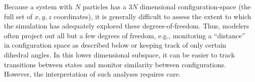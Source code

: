 




Because a system with $N$ particles has a $3N$ dimensional configuration-space (the full set of $x, y, z$ coordinates), it is generally difficult to assess the extent to which the simulation has adequately explored these degrees-of-freedom.  Thus, modelers often project out all but a few degrees of freedom, e.g., monitoring a ``distance'' in configuration space as described below or keeping track of only certain dihedral angles.  In this lower dimensional subspace, it can be easier to track transitions between states and monitor similarity between configurations.  However, the interpretation of such analyses requires care.

